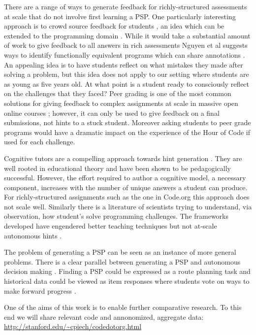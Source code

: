 There are a range of ways to generate feedback for richly-structured assessments at scale that do not involve first learning a PSP. One particularly interesting approach is to crowd source feedback for students \cite{weld2012personalized}, an idea which can be extended to the programming domain \cite{watson2012bluefix}. While it would take a substantial amount of work to give feedback to all answers in rich assessments Nguyen et al suggests ways to identify functionally equivalent programs which can share annotations \cite{nguyen2014codewebs} \cite{rivers2012canonicalizing}. An appealing idea is to have students reflect on what mistakes they made after solving a problem, but this idea does not apply to our setting where students are as young as five years old. At what point is a student ready to consciously reflect on the challenges that they faced? Peer grading is one of the most common solutions for giving feedback to complex assignments at scale in massive open online courses \cite{kulkarni2013peer}; however, it can only be used to give feedback on a final submissions, not hints to a stuck student. Moreover asking students to peer grade programs would have a dramatic impact on the experience of the Hour of Code if used for each challenge.

Cognitive tutors are a compelling approach towards hint generation  \cite{ritter2007cognitive} \cite{aleven2002effective}. They are well rooted in educational theory and have been shown to be pedagogically successful. However, the effort required to author a cognitive model, a necessary component, increases with the number of unique answers a student can produce. For richly-structured assignments such as the one in Code.org this approach does not scale well. Similarly there is a literature of scientists trying to understand, via observation, how student's solve programming challenges. The frameworks developed have engendered better teaching techniques but not at-scale autonomous hints \cite{fitzgerald2008debugging} \cite{ahmadzadeh2005analysis}.

The problem of generating a PSP can be seen as an instance of more general problems. There is a clear parallel between generating a PSP and autonomous decision making \cite{puterman2009markov}. Finding a PSP could be expressed as a route planning task \cite{szczerba2000robust} and historical data could be viewed as item responses where students vote on ways to make forward progress \cite{whitehill2009whose}.  

One of the aims of this work is to enable further comparative research. To this end we will share relevant code and annonomized, aggregate data:
\url{http://stanford.edu/~cpiech/codedotorg.html}

